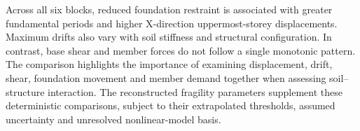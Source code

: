 Across all six blocks, reduced foundation restraint is associated with greater fundamental periods and higher X-direction uppermost-storey displacements. Maximum drifts also vary with soil stiffness and structural configuration. In contrast, base shear and member forces do not follow a single monotonic pattern. The comparison highlights the importance of examining displacement, drift, shear, foundation movement and member demand together when assessing soil--structure interaction. The reconstructed fragility parameters supplement these deterministic comparisons, subject to their extrapolated thresholds, assumed uncertainty and unresolved nonlinear-model basis.
